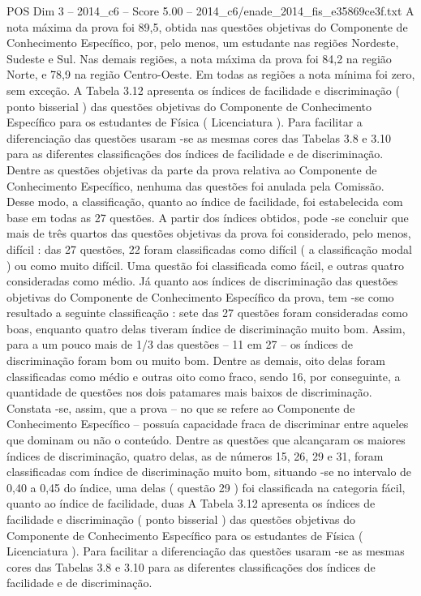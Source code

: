 \begin{textsample}{POS Dim 3 – 2014\_c6 – Score 5.00 – 2014\_c6/enade\_2014\_fis\_e35869ce3f.txt}
A nota máxima da prova foi 89,5, obtida nas questões objetivas do Componente de Conhecimento Específico, por, pelo menos, um estudante nas regiões Nordeste, Sudeste e Sul.
Nas demais regiões, a nota máxima da prova foi 84,2 na região Norte, e 78,9 na região Centro-Oeste.
Em todas as regiões a nota mínima foi zero, sem exceção.
A Tabela 3.12 apresenta os índices de facilidade e discriminação ( ponto bisserial ) das questões objetivas do Componente de Conhecimento Específico para os estudantes de Física ( Licenciatura ).
Para facilitar a diferenciação das questões usaram -se as mesmas cores das Tabelas 3.8 e 3.10 para as diferentes classificações dos índices de facilidade e de discriminação.
Dentre as questões objetivas da parte da prova relativa ao Componente de Conhecimento Específico, nenhuma das questões foi anulada pela Comissão.
Desse modo, a classificação, quanto ao índice de facilidade, foi estabelecida com base em todas as 27 questões.
A partir dos índices obtidos, pode -se concluir que mais de três quartos das questões objetivas da prova foi considerado, pelo menos, difícil : das 27 questões, 22 foram classificadas como difícil ( a classificação modal ) ou como muito difícil.
Uma questão foi classificada como fácil, e outras quatro consideradas como médio.
Já quanto aos índices de discriminação das questões objetivas do Componente de Conhecimento Específico da prova, tem -se como resultado a seguinte classificação : sete das 27 questões foram consideradas como boas, enquanto quatro delas tiveram índice de discriminação muito bom.
Assim, para a um pouco mais de 1/3 das questões – 11 em 27 – os índices de discriminação foram bom ou muito bom.
Dentre as demais, oito delas foram classificadas como médio e outras oito como fraco, sendo 16, por conseguinte, a quantidade de questões nos dois patamares mais baixos de discriminação.
Constata -se, assim, que a prova – no que se refere ao Componente de Conhecimento Específico – possuía capacidade fraca de discriminar entre aqueles que dominam ou não o conteúdo.
Dentre as questões que alcançaram os maiores índices de discriminação, quatro delas, as de números 15, 26, 29 e 31, foram classificadas com índice de discriminação muito bom, situando -se no intervalo de 0,40 a 0,45 do índice, uma delas ( questão 29 ) foi classificada na categoria fácil, quanto ao índice de facilidade, duas A Tabela 3.12 apresenta os índices de facilidade e discriminação ( ponto bisserial ) das questões objetivas do Componente de Conhecimento Específico para os estudantes de Física ( Licenciatura ).
Para facilitar a diferenciação das questões usaram -se as mesmas cores das Tabelas 3.8 e 3.10 para as diferentes classificações dos índices de facilidade e de discriminação.

\end{textsample}
